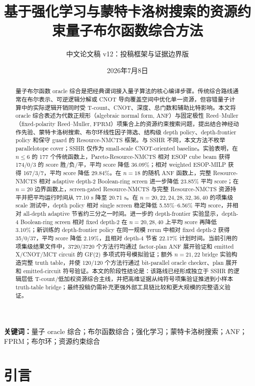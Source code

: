 \documentclass[UTF8,fontset=macnew,11pt]{ctexart}
\title{基于强化学习与蒙特卡洛树搜索的资源约束量子布尔函数综合方法}
\author{中文论文稿 v12：投稿框架与证据边界版}
\date{2026年7月8日}
\newcommand{\method}{Resource-NMCTS}
\newcommand{\screen}{Boolean-ring screen}
\newcommand{\anf}{\ensuremath{\mathrm{ANF}}}
\newcommand{\fprm}{\ensuremath{\mathrm{FPRM}}}
\begin{document}
\pagestyle{plain}
\maketitle

\begin{abstract}
量子布尔函数 oracle 综合是把经典谓词接入量子算法的核心编译步骤。传统综合路线通常在布尔表示、可逆逻辑分解或 CNOT 导向覆盖空间中优化单一资源，但容错量子计算中的实际逻辑开销同时受 T-count、CNOT、深度、总门数和辅助比特影响。本文将 oracle 综合表述为代数正规形（algebraic normal form, \anf{}）与固定极性 Reed--Muller（fixed-polarity Reed--Muller, \fprm{}）项集合上的资源约束搜索问题，提出结合神经动作先验、蒙特卡洛树搜索、布尔环线性因子筛选、结构级 depth policy、depth-frontier policy 和保守 guard 的 \method{} 框架。与 SSHR 不同，本文方法不枚举 parallelotope cover；SSHR 仅作为 small-scale CNOT-oriented baseline。实验表明，在 $n\leq6$ 的 177 个传统函数上，Pareto-\method{} 相对 ESOP cube beam 获得 174/0/3 的 score 胜/负/平，平均 score 降低 36.09\%；相对 weighted ESOP-MILP 获得 167/3/7，平均 score 降低 29.84\%。在 $n=18$ 的随机 \anf{} 函数上，完整 \method{} 相对 adaptive depth-2 \screen{} 进一步降低 23.85\% 平均 score；在 $n=20$ 边界函数上，screen-gated \method{} 与完整 \method{} 资源持平并把平均运行时间从 77.10 s 降至 20.71 s。在 $n=20,22,24,28,32,36,40$ 的项集级 scale 测试中，depth policy 相对 single screen 稳定降低 5.55\%--6.56\% 平均 score，并相对 all-depth adaptive 节省约三分之一时间。进一步的 depth-frontier 实验显示，depth-4 \screen{} 相对 fixed depth-2 在 $n=20,28,40$ 上平均 score 再降低 3.10\%；新训练的 depth-frontier policy 在同一规模 rerun 中相对 fixed depth-2 获得 35/0/37，平均 score 降低 2.19\%，且相对 depth-4 节省 22.17\% 计划时间。当前引用的项集级结果文件中，3720/3720 个方法行均通过 factor-plan \anf{} 展开验证和 emitted X/CNOT/MCT circuit 的 GF(2) 多项式符号模拟验证；额外 $n=21,22$ bridge 实验构造完整 truth table，并使 120/120 个方法行通过 bit-parallel oracle checker、plan 展开和 emitted-circuit 符号验证。本文的阶段性结论是：该路线已经形成独立于 SSHR 的逻辑层低 T-count/低加权资源综合主线，并把高维证据从纯符号项集验证推进到小样本 truth-table bridge；最终投稿仍需补充更强外部工具链比较和更大规模的完整语义验证。
\end{abstract}

\noindent\textbf{关键词：}量子 oracle 综合；布尔函数综合；强化学习；蒙特卡洛树搜索；ANF；FPRM；布尔环；资源约束综合

\section{引言}
\end{document}

